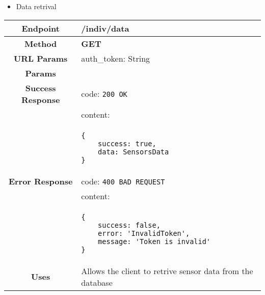     \begin{itemize}
        \item Data retrival
    \end{itemize}
    \begin{adjustwidth}{1cm}{}
        \begin{tabular}{|c|l|}
            \hline
            \textbf{Endpoint} & /indiv/data \\
            \hline
            \textbf{Method} & \textbf{GET} \\
            \hline
            \textbf{URL Params} &  auth\_token: String \\
            \hline
            \textbf{Params} &   \\
            \hline
            \textbf{Success Response} & code: \texttt{200 OK} \\
            &                           content: \\
            & \begin{minipage}[t]{0.5\textwidth}
                \begin{adjustwidth}{1.5cm}{}
                \begin{verbatim}
{
    success: true, 
    data: SensorsData
}
                \end{verbatim}
                \end{adjustwidth}
              \end{minipage} \\
              \hline
            \textbf{Error Response} & code: \texttt{400 BAD REQUEST} \\
            &                         content: \\
            & \begin{minipage}[t]{0.7\textwidth}
                \begin{adjustwidth}{1.5cm}{}
                \begin{verbatim}
{
    success: false, 
    error: 'InvalidToken',
    message: 'Token is invalid'
}
                \end{verbatim}
                \end{adjustwidth}
              \end{minipage} \\
              \hline
            \textbf{Uses} & Allows the client to retrive sensor data from the database \\
            \hline
        \end{tabular}
    \end{adjustwidth}
    
